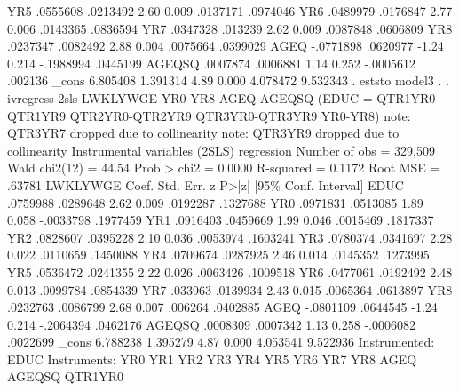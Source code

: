          YR5 {\VBAR}   .0555608   .0213492     2.60   0.009     .0137171    .0974046
         YR6 {\VBAR}   .0489979   .0176847     2.77   0.006     .0143365    .0836594
         YR7 {\VBAR}   .0347328    .013239     2.62   0.009     .0087848    .0606809
         YR8 {\VBAR}   .0237347   .0082492     2.88   0.004     .0075664    .0399029
        AGEQ {\VBAR}  -.0771898   .0620977    -1.24   0.214    -.1988994    .0445199
      AGEQSQ {\VBAR}   .0007874   .0006881     1.14   0.252    -.0005612     .002136
       _cons {\VBAR}   6.805408   1.391314     4.89   0.000     4.078472    9.532343
{\smallskip}
. eststo model3
{\smallskip}
. 
. ivregress 2sls LWKLYWGE YR0-YR8 AGEQ AGEQSQ (EDUC = QTR1YR0-QTR1YR9 QTR2YR0-QTR2YR9 QTR3YR0-QTR3YR9 YR0-YR8)
note: QTR3YR7 dropped due to collinearity
note: QTR3YR9 dropped due to collinearity
{\smallskip}
Instrumental variables (2SLS) regression          Number of obs   =    329,509
                                                  Wald chi2(12)   =      44.54
                                                  Prob > chi2     =     0.0000
                                                  R-squared       =     0.1172
                                                  Root MSE        =     .63781
{\smallskip}
    LWKLYWGE {\VBAR}      Coef.   Std. Err.      z    P>|z|     [95\% Conf. Interval]
        EDUC {\VBAR}   .0759988   .0289648     2.62   0.009     .0192287    .1327688
         YR0 {\VBAR}   .0971831   .0513085     1.89   0.058    -.0033798    .1977459
         YR1 {\VBAR}   .0916403   .0459669     1.99   0.046     .0015469    .1817337
         YR2 {\VBAR}   .0828607   .0395228     2.10   0.036     .0053974    .1603241
         YR3 {\VBAR}   .0780374   .0341697     2.28   0.022     .0110659    .1450088
         YR4 {\VBAR}   .0709674   .0287925     2.46   0.014     .0145352    .1273995
         YR5 {\VBAR}   .0536472   .0241355     2.22   0.026     .0063426    .1009518
         YR6 {\VBAR}   .0477061   .0192492     2.48   0.013     .0099784    .0854339
         YR7 {\VBAR}    .033963   .0139934     2.43   0.015     .0065364    .0613897
         YR8 {\VBAR}   .0232763   .0086799     2.68   0.007      .006264    .0402885
        AGEQ {\VBAR}  -.0801109   .0644545    -1.24   0.214    -.2064394    .0462176
      AGEQSQ {\VBAR}   .0008309   .0007342     1.13   0.258    -.0006082    .0022699
       _cons {\VBAR}   6.788238   1.395279     4.87   0.000     4.053541    9.522936
Instrumented:  EDUC
Instruments:   YR0 YR1 YR2 YR3 YR4 YR5 YR6 YR7 YR8 AGEQ AGEQSQ QTR1YR0
